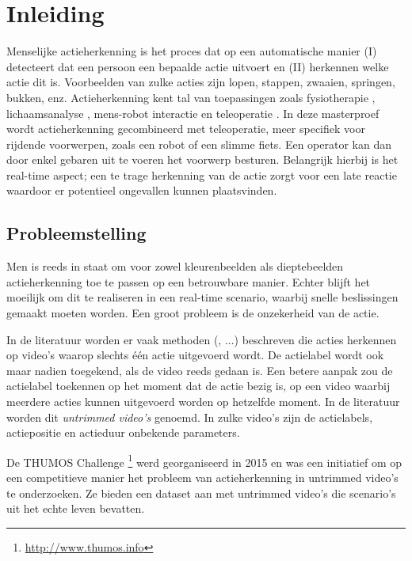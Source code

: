 \setcounter{page}{1}
\chapter{Inleiding}
\label{ch:Inleiding}
Menselijke actieherkenning is het proces dat op een automatische manier (I) detecteert dat een persoon een bepaalde actie uitvoert en (II) herkennen welke actie dit is. Voorbeelden van zulke acties zijn lopen, stappen, zwaaien, springen, bukken, enz. Actieherkenning kent tal van toepassingen zoals fysiotherapie \cite{Deboeverie2016}, lichaamsanalyse \cite{Devi2015}, mens-robot interactie \cite{Li2018} en teleoperatie \cite{Ajili2017}. In deze masterproef wordt actieherkenning gecombineerd met teleoperatie, meer specifiek voor rijdende voorwerpen, zoals een robot of een slimme fiets. Een operator kan dan door enkel gebaren uit te voeren het voorwerp besturen. Belangrijk hierbij is het real-time aspect; een te trage herkenning van de actie zorgt voor een late reactie waardoor er potentieel ongevallen kunnen plaatsvinden. 

\section{Probleemstelling}
Men is reeds in staat om voor zowel kleurenbeelden als dieptebeelden actieherkenning toe te passen op een betrouwbare manier. Echter blijft het moeilijk om dit te realiseren in een real-time scenario, waarbij snelle beslissingen gemaakt moeten worden. Een groot probleem is de onzekerheid van de actie. 

In de literatuur worden er vaak methoden (\cite{Xia2012}, ...) beschreven die acties herkennen op video's waarop slechts één actie uitgevoerd wordt. De actielabel wordt ook maar nadien toegekend, als de video reeds gedaan is. Een betere aanpak zou de actielabel toekennen op het moment dat de actie bezig is, op een video waarbij meerdere acties kunnen uitgevoerd worden op hetzelfde moment. In de literatuur worden dit \textit{untrimmed video's} genoemd. In zulke video's zijn de actielabels, actiepositie en actieduur onbekende parameters.

De THUMOS Challenge \footnote{\url{http://www.thumos.info}} werd georganiseerd in 2015 en was een initiatief om op een competitieve manier het probleem van actieherkenning in untrimmed video's te onderzoeken. Ze bieden een dataset aan met untrimmed video's die scenario's uit het echte leven bevatten.

